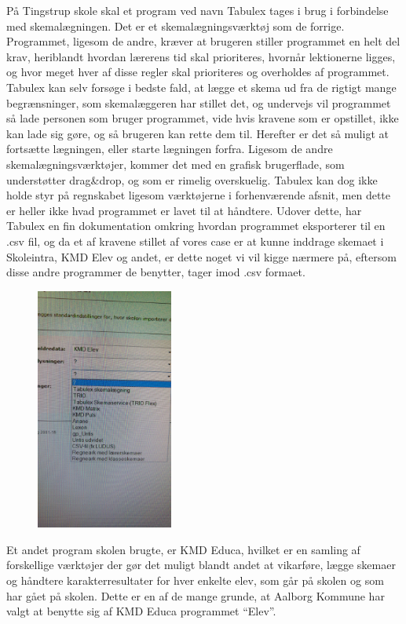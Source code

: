 På Tingstrup skole skal et program ved navn Tabulex tages i brug i forbindelse med skemalægningen. Det er et skemalægningsværktøj som de forrige. Programmet, ligesom de andre, kræver at brugeren stiller programmet en helt del krav, heriblandt hvordan lærerens tid skal prioriteres, hvornår lektionerne ligges, og hvor meget hver af disse regler skal prioriteres og overholdes af programmet\cite{Tabulex}. Tabulex kan selv forsøge i bedste fald, at lægge et skema ud fra de rigtigt mange begrænsninger, som skemalæggeren har stillet det, og undervejs vil programmet så lade personen som bruger programmet, vide hvis kravene som er opstillet, ikke kan lade sig gøre, og så brugeren kan rette dem til. Herefter er det så muligt at fortsætte lægningen, eller starte lægningen forfra. Ligesom de andre skemalægningsværktøjer, kommer det med en grafisk brugerflade, som understøtter drag\&drop, og som er rimelig overskuelig. Tabulex kan dog ikke holde styr på regnskabet ligesom værktøjerne i forhenværende afsnit, men dette er heller ikke hvad programmet er lavet til at håndtere. Udover dette, har Tabulex en fin dokumentation omkring hvordan programmet eksporterer til en .csv fil\cite{Tabulex_csv}, og da et af kravene stillet af vores case er at kunne inddrage skemaet i Skoleintra, KMD Elev og andet\cite{Interview_Kaerby}, er dette noget vi vil kigge nærmere på, eftersom disse andre programmer de benytter, tager imod .csv formaet.
\begin{figure}[h!]
	\centering
	\includegraphics[width=0.4\textwidth]{../Billeder/Skemaimportering_filtyper_Intra.jpg}{}
	\label{fig:Mercedes-Benz_F_015}
\end{figure}
\FloatBarrier
Et andet program skolen brugte, er KMD Educa, hvilket er en samling af forskellige værktøjer\cite{KMD} der gør det muligt blandt andet at vikarføre, lægge skemaer og håndtere karakterresultater for hver enkelte elev, som går på skolen og som har gået på skolen. Dette er en af de mange grunde, at Aalborg Kommune har valgt at benytte sig af KMD Educa programmet ``Elev''\cite{useCase_KMD_Educa_Elev}.

